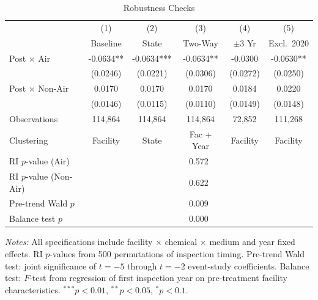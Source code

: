 \begin{table}[htbp]
\centering
\caption{Robustness Checks}
\label{tab:robust}
\begin{tabular}{lccccc}
\toprule
& (1) & (2) & (3) & (4) & (5) \\
& Baseline & State & Two-Way & $\pm 3$ Yr & Excl.\ 2020 \\
\midrule
Post $\times$ Air & -0.0634** & -0.0634*** & -0.0634** & -0.0300 & -0.0630** \\
& (0.0246) & (0.0221) & (0.0306) & (0.0272) & (0.0250) \\[6pt]
Post $\times$ Non-Air & 0.0170 & 0.0170 & 0.0170 & 0.0184 & 0.0220 \\
& (0.0146) & (0.0115) & (0.0110) & (0.0149) & (0.0148) \\[6pt]
\midrule
Observations & 114,864 & 114,864 & 114,864 & 72,852 & 111,268 \\
Clustering & Facility & State & Fac + Year & Facility & Facility \\
\midrule
RI $p$-value (Air) & \multicolumn{5}{c}{0.572} \\
RI $p$-value (Non-Air) & \multicolumn{5}{c}{0.622} \\
Pre-trend Wald $p$ & \multicolumn{5}{c}{0.009} \\
Balance test $p$ & \multicolumn{5}{c}{0.000} \\
\bottomrule
\end{tabular}
\begin{minipage}{0.95\textwidth}
\vspace{0.3em}
\footnotesize \textit{Notes:} All specifications include facility $\times$ chemical $\times$ medium and year fixed effects. RI $p$-values from 500 permutations of inspection timing. Pre-trend Wald test: joint significance of $t = -5$ through $t = -2$ event-study coefficients. Balance test: $F$-test from regression of first inspection year on pre-treatment facility characteristics. $^{***}p<0.01$, $^{**}p<0.05$, $^{*}p<0.1$.
\end{minipage}
\end{table}
